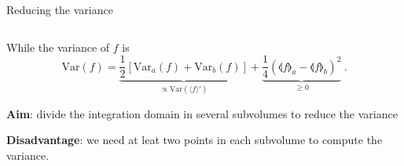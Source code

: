 \documentclass[t,handout,professionalfont,serif]{beamer}
\begin{document}
\begin{frame}{Reducing the variance}
\begin{columns}
\begin{column}{0.5 \textwidth}
			While the variance of $f$ is 
			\begin{equation*}
				\text{Var}(f) = \underbrace{\frac{1}{2} [ \text{Var}_a(f) + \text{Var}_b(f)]}_{\propto \text{Var}(\langle f \rangle ') } + \underbrace{\frac{1}{4} ( 
					\llangle f \rrangle_a - \llangle f \rrangle_b)^2}_{ \geq 0} \ .
			\end{equation*}
			\vspace{0.05cm}
			
			\textbf{Aim}: divide the integration domain in several subvolumes to reduce the variance
			\vspace{0.05cm}
			
			\textbf{Disadvantage}: we need at leat two points in each subvolume to compute the variance.
		\end{column}
	\end{columns}
\end{frame}
\end{document}

